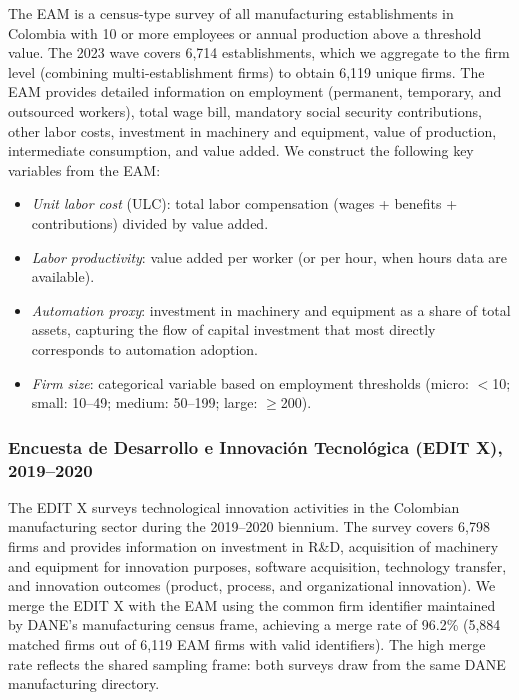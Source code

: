 The EAM is a census-type survey of all manufacturing establishments in Colombia with 10 or more employees or annual production above a threshold value. The 2023 wave covers 6,714 establishments, which we aggregate to the firm level (combining multi-establishment firms) to obtain 6,119 unique firms. The EAM provides detailed information on employment (permanent, temporary, and outsourced workers), total wage bill, mandatory social security contributions, other labor costs, investment in machinery and equipment, value of production, intermediate consumption, and value added. We construct the following key variables from the EAM:

\begin{itemize}[nosep]
\item \textit{Unit labor cost} (ULC): total labor compensation (wages + benefits + contributions) divided by value added.
\item \textit{Labor productivity}: value added per worker (or per hour, when hours data are available).
\item \textit{Automation proxy}: investment in machinery and equipment as a share of total assets, capturing the flow of capital investment that most directly corresponds to automation adoption.
\item \textit{Firm size}: categorical variable based on employment thresholds (micro: $<$10; small: 10--49; medium: 50--199; large: $\geq$200).
\end{itemize}

\subsubsection*{Encuesta de Desarrollo e Innovaci\'on Tecnol\'ogica (EDIT X), 2019--2020}

The EDIT X surveys technological innovation activities in the Colombian manufacturing sector during the 2019--2020 biennium. The survey covers 6,798 firms and provides information on investment in R\&D, acquisition of machinery and equipment for innovation purposes, software acquisition, technology transfer, and innovation outcomes (product, process, and organizational innovation). We merge the EDIT X with the EAM using the common firm identifier maintained by DANE's manufacturing census frame, achieving a merge rate of 96.2\% (5,884 matched firms out of 6,119 EAM firms with valid identifiers). The high merge rate reflects the shared sampling frame: both surveys draw from the same DANE manufacturing directory.


